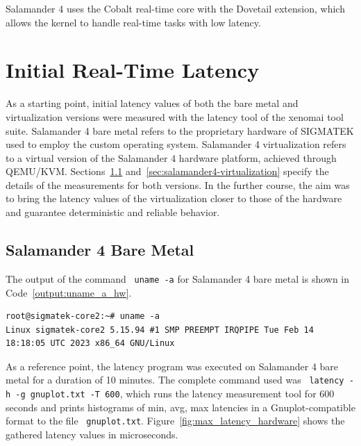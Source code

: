 \documentclass[MMR,Master,english]{twbook}
\begin{document}
\noindent Salamander 4 uses the Cobalt real-time core with the Dovetail extension, which allows the kernel to handle real-time tasks with low latency.

\clearpage

\chapter{Initial Real-Time Latency}\label{cha:initial-real-time-latency}

As a starting point, initial latency values of both the bare metal and virtualization versions were measured with the latency tool of the xenomai tool suite. Salamander 4 bare metal refers to the proprietary hardware of SIGMATEK used to employ the custom operating system. Salamander 4 virtualization refers to a virtual version of the Salamander 4 hardware platform, achieved through QEMU/KVM. Sections~\ref{sec:salamander4-bare-metal} and~\ref{sec:salamander4-virtualization} specify the details of the measurements for both versions. In the further course, the aim was to bring the latency values of the virtualization closer to those of the hardware and guarantee deterministic and reliable behavior. 

\section{Salamander 4 Bare Metal}\label{sec:salamander4-bare-metal}
The output of the command ~\texttt{uname -a} for Salamander 4 bare metal is shown in Code~\ref{output:uname_a_hw}.

\vspace{1em}
\begin{minipage}{0.95\columnwidth}
	\begin{lstlisting}[name={Salamander 4 bare metal system information},label={output:uname_a_hw}]
root@sigmatek-core2:~# uname -a 
Linux sigmatek-core2 5.15.94 #1 SMP PREEMPT IRQPIPE Tue Feb 14 18:18:05 UTC 2023 x86_64 GNU/Linux
\end{lstlisting}
\end{minipage}

\noindent As a reference point, the latency program was executed on Salamander 4 bare metal for a duration of 10 minutes. The complete command used was ~\texttt{latency -h -g gnuplot.txt -T 600}, which runs the latency measurement tool for 600 seconds and prints histograms of min, avg, max latencies in a Gnuplot-compatible format to the file ~\texttt{gnuplot.txt}. Figure~\ref{fig:max_latency_hardware} shows the gathered latency values in microseconds.
\end{document}

